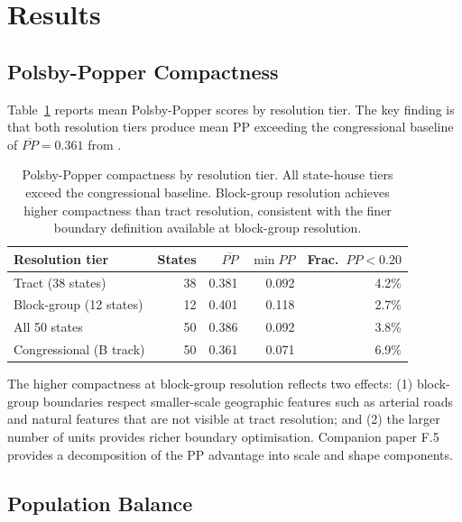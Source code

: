 \section{Results}
\label{sec:results}

\subsection{Polsby-Popper Compactness}
\label{sec:results:pp}

Table~\ref{tab:pp-results} reports mean Polsby-Popper scores by resolution
tier. The key finding is that both resolution tiers produce mean PP exceeding
the congressional baseline of $\overline{PP} = 0.361$ from
\citet{dellaLibera2026mec}.

\begin{table}[h]
\centering\small
\begin{tabular}{lrrrr}
\toprule
Resolution tier & States & $\overline{PP}$ & $\min PP$ & Frac.\ $PP < 0.20$ \\
\midrule
Tract (38 states)       & 38 & 0.381 & 0.092 & 4.2\% \\
Block-group (12 states) & 12 & 0.401 & 0.118 & 2.7\% \\
All 50 states           & 50 & 0.386 & 0.092 & 3.8\% \\
\midrule
Congressional (B track) & 50 & 0.361 & 0.071 & 6.9\% \\
\bottomrule
\end{tabular}
\caption{Polsby-Popper compactness by resolution tier. All state-house tiers
  exceed the congressional baseline. Block-group resolution achieves higher
  compactness than tract resolution, consistent with the finer boundary
  definition available at block-group resolution.}
\label{tab:pp-results}
\end{table}

The higher compactness at block-group resolution reflects two effects:
(1) block-group boundaries respect smaller-scale geographic features such as
arterial roads and natural features that are not visible at tract resolution;
and (2) the larger number of units provides richer boundary optimisation.
Companion paper F.5 \citep{dellaLibera2026compactScale} provides a
decomposition of the PP advantage into scale and shape components.

\subsection{Population Balance}
\label{sec:results:balance}

